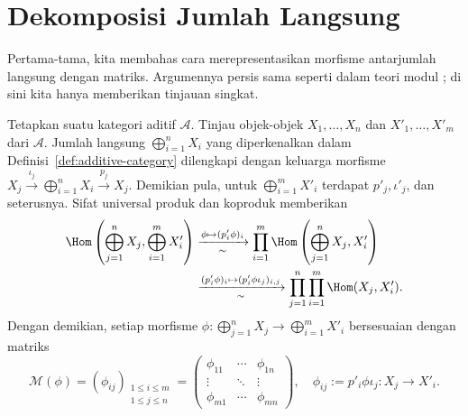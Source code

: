 
\section{Dekomposisi Jumlah Langsung}\label{sec:direct-sum}
\hypertarget{o014.aljabr2.chapter2.direct-sum-decomposition}{ }

Pertama-tama, kita membahas cara merepresentasikan morfisme antarjumlah
langsung dengan matriks. Argumennya persis sama seperti dalam
teori modul \cite[\S 6.3]{Li1}; di sini kita hanya memberikan tinjauan singkat.

Tetapkan suatu kategori aditif $\mathcal{A}$. Tinjau objek-objek
$X_1, \ldots, X_n$ dan $X'_1, \ldots, X'_m$ dari $\mathcal{A}$. Jumlah
langsung $\bigoplus_{i=1}^n X_i$ yang diperkenalkan dalam
Definisi~\ref{def:additive-category} dilengkapi dengan keluarga morfisme
$X_j \xrightarrow{\iota_j} \bigoplus_{i=1}^n X_i \xrightarrow{p_j} X_j$.
Demikian pula, untuk $\bigoplus_{i=1}^m X'_i$ terdapat $p'_j,\iota'_j$, dan
seterusnya. Sifat universal produk dan koproduk memberikan
\begin{align*}
	\Hom \left( \bigoplus_{j=1}^n X_j, \bigoplus_{i=1}^m X'_i \right) & \xrightarrow[\sim]{\phi \mapsto (p'_i \phi)_i } \prod_{i=1}^m \Hom\left(\bigoplus_{j=1}^n X_j , X'_i \right) \\
	& \xrightarrow[\sim]{(p'_i \phi)_i \mapsto (p'_i \phi \iota_j)_{i, j}} \prod_{j=1}^n \prod_{i=1}^m  \Hom(X_j, X'_i).
\end{align*}
Dengan demikian, setiap morfisme
$\phi: \bigoplus_{j=1}^n X_j \to \bigoplus_{i=1}^m X'_i$ bersesuaian dengan
matriks
\[ \mathcal{M}(\phi) = (\phi_{ij})_{\substack{1 \leq i \leq m \\ 1 \leq j \leq n}} = \begin{pmatrix}
	\phi_{11} & \cdots & \phi_{1n} \\
	\vdots & \ddots & \vdots \\
	\phi_{m1} & \cdots & \phi_{mn}
\end{pmatrix}, \quad \phi_{ij} := p'_i \phi \iota_j: X_j \to X'_i. \]

